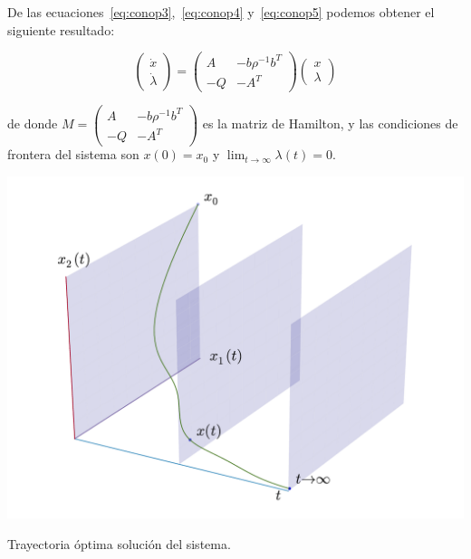     De las ecuaciones~\ref{eq:conop3},~\ref{eq:conop4} y~\ref{eq:conop5} podemos obtener el siguiente resultado:

    \begin{equation} \label{eq:conop6}
        \begin{pmatrix}
            \dot{x} \\
            \dot{\lambda}
        \end{pmatrix} =
        \begin{pmatrix}
            A & -b \rho^{-1} b^T \\
            - Q & - A^T
        \end{pmatrix}
        \begin{pmatrix}
            x \\
            \lambda
        \end{pmatrix}
    \end{equation}

    de donde $M = \begin{pmatrix} A & -b \rho^{-1} b^T \\ - Q & - A^T \end{pmatrix}$ es la matriz de Hamilton, y las condiciones de frontera del sistema son $x(0) = x_0$ y $\lim_{t \to \infty} \lambda(t) = 0$.

    \begin{marginfigure}
        \centering
        \includegraphics[width=\textwidth]{./imagenes/trayectoria3d.pdf}
        \caption{\label{fig:trayectoriaoptima}Trayectoria óptima solución del sistema.}
    \end{marginfigure}

